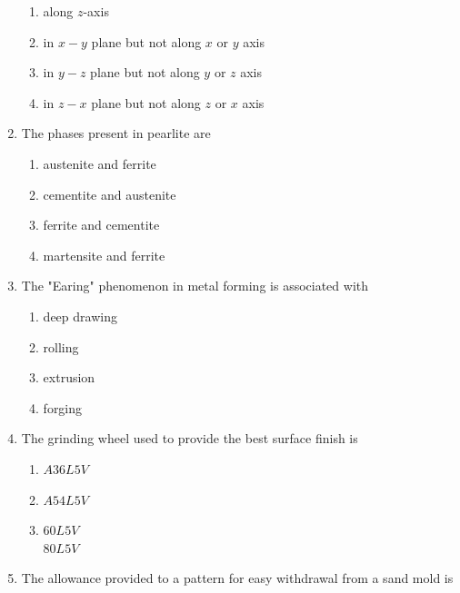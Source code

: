 \documentclass[journal]{IEEEtran}
\begin{document}
\begin{enumerate}
\begin{figure}[h!]
\end{figure}
\begin{enumerate}
    \item along $z$-axis\\
    \item in $x-y$ plane but not along $x$ or $y$ axis\\
    \item in $y-z$ plane but not along $y$ or $z$ axis\\
    \item in $z-x$ plane but not along $z$ or $x$ axis
\end{enumerate}
\item The phases present in pearlite are\\
\begin{enumerate}
    \item austenite and ferrite\\
    \item cementite and austenite\\
    \item ferrite and cementite\\
    \item martensite and ferrite
\end{enumerate}
\item The "Earing" phenomenon in metal forming is associated with\\
\begin{enumerate}
    \item deep drawing\\
    \item rolling\\
    \item extrusion\\
    \item forging
\end{enumerate}
\item The grinding wheel used to provide the best surface finish is\\
\begin{enumerate}
   \item $A36L5V$\\
    \item $A54L5V$\\
    \item $60L5V$\\
   \itm $80L5V$
\end{enumerate}
\item The allowance provided to a pattern for easy withdrawal from a sand mold is\\

\end{enumerate}
\end{document}
